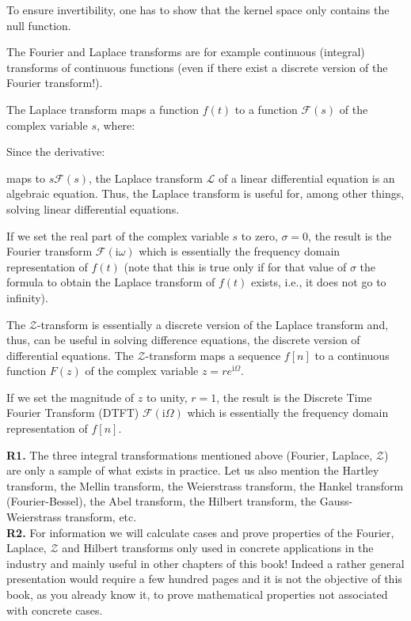 	To ensure invertibility, one has to show that the kernel space only contains the null function.

	The Fourier and Laplace transforms are for example continuous (integral) transforms of continuous functions (even if there exist a discrete version of the Fourier transform!).

	The Laplace transform maps a function $f(t)$ to a function $\mathcal{F}(s)$ of the complex variable $s$, where:
	
	Since the derivative:
	
	maps to $s\mathcal{F}(s)$, the Laplace transform $\mathcal{L}$ of a linear differential equation is an algebraic equation. Thus, the Laplace transform is useful for, among other things, solving linear differential equations.
	
	If we set the real part of the complex variable $s$ to zero, $\sigma=0$, the result is the Fourier transform $\mathcal{F}(\mathrm{i}\omega)$ which is essentially the frequency domain representation of $f(t)$ (note that this is true only if for that value of $\sigma$ the formula to obtain the Laplace transform of $f(t)$ exists, i.e., it does not go to infinity).
	
	The $\mathcal{Z}$-transform is essentially a discrete version of the Laplace transform and, thus, can be useful in solving difference equations, the discrete version of differential equations. The $\mathcal{Z}$-transform maps a sequence $f[n]$ to a continuous function $F(z)$ of the complex variable $z=re^{\mathrm{i}\Omega}$.
	
	If we set the magnitude of $z$ to unity, $r=1$, the result is the Discrete Time Fourier Transform (DTFT) $\mathcal{F}(\mathrm{i}\Omega)$ which is essentially the frequency domain representation of $f[n]$.
	
	\begin{tcolorbox}[title=Remarks,colframe=black,arc=10pt]
	\textbf{R1.} The three integral transformations mentioned above (Fourier, Laplace, $\mathcal{Z}$) are only a sample of what exists in practice. Let us also mention the Hartley transform, the Mellin transform, the Weierstrass transform, the Hankel transform (Fourier-Bessel), the Abel transform, the Hilbert transform, the Gauss-Weierstrass transform, etc.\\
	
	\textbf{R2.} For information we will calculate cases and prove properties of the Fourier, Laplace, $\mathcal{Z}$ and Hilbert transforms only used in concrete applications in the industry and mainly useful in other chapters of this book! Indeed a rather general presentation would require a few hundred pages and it is not the objective of this book, as you already know it, to prove mathematical properties not associated with concrete cases.
	\end{tcolorbox} 
	
